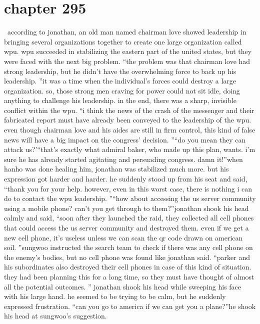 \section{chapter 295}






 according to jonathan, an old man named chairman love showed leadership in bringing several organizations together to create one large organization called wpu.
wpu succeeded in stabilizing the eastern part of the united states, but they were faced with the next big problem.
“the problem was that chairman love had strong leadership, but he didn’t have the overwhelming force to back up his leadership.
”it was a time when the individual’s forces could destroy a large organization.
 so, those strong men craving for power could not sit idle, doing anything to challenge his leadership.
in the end, there was a sharp, invisible conflict within the wpu.
“i think the news of the crash of the messenger and their fabricated report must have already been conveyed to the leadership of the wpu.
 even though chairman love and his aides are still in firm control, this kind of false news will have a big impact on the congress’ decision.
”“do you mean they can attack us?’“that’s exactly what admiral baker, who made up this plan, wants.
 i’m sure he has already started agitating and persuading congress.
 damn it!”when hanho was done healing him, jonathan was stabilized much more.
but his expression got harder and harder.
he suddenly stood up from his seat and said, “thank you for your help.
 however, even in this worst case, there is nothing i can do to contact the wpu leadership.
”“how about accessing the us server community using a mobile phone? can’t you get through to them?”jonathan shook his head calmly and said, “soon after they launched the raid, they collected all cell phones that could access the us server community and destroyed them.
 even if we get a new cell phone, it’s useless unless we can scan the qr code drawn on american soil.
”sungwoo instructed the search team to check if there was any cell phone on the enemy’s bodies, but no cell phone was found like jonathan said.
“parker and his subordinates also destroyed their cell phones in case of this kind of situation.
 they had been planning this for a long time, so they must have thought of almost all the potential outcomes.
”
jonathan shook his head while sweeping his face with his large hand.
he seemed to be trying to be calm, but he suddenly expressed frustration.
“can you go to america if we can get you a plane?”he shook his head at sungwoo’s suggestion.
